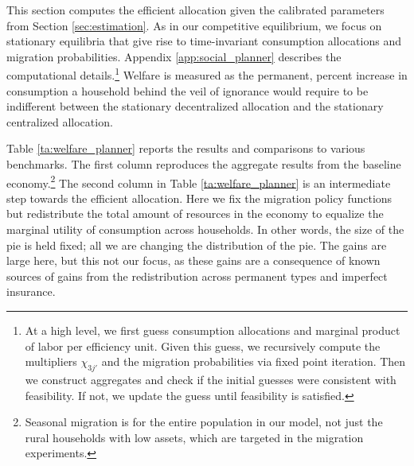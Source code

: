 \documentclass[12pt,pdftex]{article}
\begin{document}
This section computes the efficient allocation given the calibrated parameters from Section \ref{sec:estimation}.  As in our competitive equilibrium, we focus on stationary equilibria that give rise to time-invariant consumption allocations and migration probabilities. Appendix \ref{app:social_planner} describes the computational details.\footnote{At a high level, we first guess consumption allocations and marginal product of labor per efficiency unit. Given this guess, we recursively compute the multipliers $\chi_{3j'}$ and the migration probabilities via fixed point iteration. Then we construct aggregates and check if the initial guesses were consistent with feasibility. If not, we update the guess until feasibility is satisfied.} Welfare is measured as the permanent, percent increase in consumption a household behind the veil of ignorance would require to be indifferent between the stationary decentralized allocation and the stationary centralized allocation.

Table \ref{ta:welfare_planner} reports the results and comparisons to various benchmarks. The first column reproduces the aggregate results from the baseline economy.\footnote{Seasonal migration is for the entire population in our model, not just the rural households with low assets, which are targeted in the migration experiments.} The second column in Table \ref{ta:welfare_planner} is an intermediate step towards the efficient allocation. Here we fix the migration policy functions but redistribute the total amount of resources in the economy to equalize the marginal utility of consumption across households. In other words, the size of the pie is held fixed; all we are changing the distribution of the pie. The gains are large here, but this not our focus, as these gains are a consequence of known sources of gains from the redistribution across permanent types and imperfect insurance.

\end{document}
